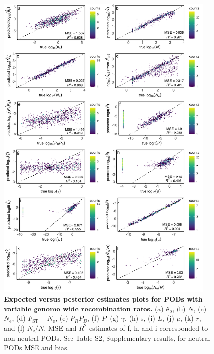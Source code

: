 \documentclass[a4paper, 12pt]{article}
\begin{document}
\begin{figure}[ht]
 \centering
 \includegraphics[width=0.95\textwidth]{Figures/FigureS5_posterior_plots_recombination.pdf}
 \small\caption{\textbf{Expected versus posterior estimates plots for PODs with variable genome-wide recombination rates.} (a) $\theta_{\mathrm{b}}$, (b) $N$, (c) $N_{\mathrm{e}}$, (d) $F_{\mathrm{ST}}-N_{\mathrm{e}}$, (e) $P_RP_B$, (f) $P$, (g) $\gamma$, (h) $\bar{s}$, (i) $L$, (j) $\mu$, (k) $r$, and (l) $N_{\mathrm{e}}/N$. MSE and $R^2$ estimates of f, h, and i corresponded to non-neutral PODs. See Table S2, Supplementary results, for neutral PODs MSE and bias.}
 \label{fig:supple_pods_variable_recomb}
\end{figure}
\end{document}
